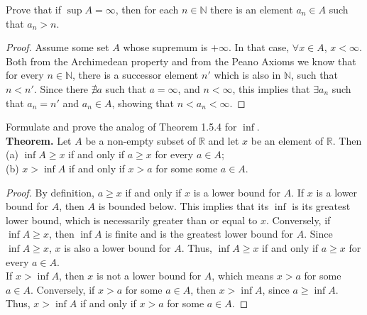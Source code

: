 \documentclass[12pt]{book}
\newenvironment{exercise}[2][Exercise]{\begin{trivlist}
\item[\hskip \labelsep {\bfseries #1}\hskip \labelsep {\bfseries #2.}]}{\end{trivlist}}
\begin{document}
\begin{exercise}{1.5.4}
Prove that if $\sup A = \infty$, then for each $n \in \mathbb{N}$ there is an element $a_n \in A$
such that $a_n > n$. 

\begin{proof}
Assume some set $A$ whose supremum is $+\infty$. In that case, $\forall x \in A$, $x < \infty$. Both from the Archimedean property and from the Peano Axioms we know that for every $n \in \mathbb{N}$, there is a successor element $n'$ which is also in $\mathbb{N}$, such that $n < n'$. Since there $\nexists a$ such that $a = \infty$, and $n<\infty$, this implies that $\exists a_n$ such that $a_n = n'$ and $a_n \in A$, showing that $n < a_n < \infty$.
\end{proof}
\end{exercise}




\begin{exercise}{1.5.5}
Formulate and prove the analog of Theorem 1.5.4 for $\inf$. \\

\textbf{Theorem.} Let $A$ be a non-empty subset of $\mathbb{R}$ and let $x$ be an element of $\mathbb{R}$. Then \\ 
(a) $\inf A \geq x$ if and only if $a \geq x$ for every $a \in A$;\\
(b) $x > \inf A$ if and only if $x > a$ for some some $a \in A$.

	\begin{proof}
	By definition, $a \geq x$ if and only if $x$ is a lower bound for $A$. If $x$ is a lower bound for $A$, then $A$ is bounded below. This implies that its $\inf$ is its greatest lower bound, which is necessarily greater than or equal to $x$. Conversely, if $\inf A \geq x$, then $\inf A$ is finite and is the greatest lower bound for $A$. Since $\inf A \geq x$, $x$ is also  a lower bound for $A$. Thus, $\inf A \geq x$ if and only if $a \geq x$ for every $a \in A$. \\
	If $x > \inf A$, then $x$ is not a lower bound for $A$, which means $x >a$ for some $a \in A$. Conversely, if $x > a$ for some $a  \in A$, then $x> \inf A$, since $a \geq \inf A$. Thus, $x > \inf A$ if and only if $x > a$ for some $a \in A$.
	\end{proof}
\end{exercise}
\end{document}
